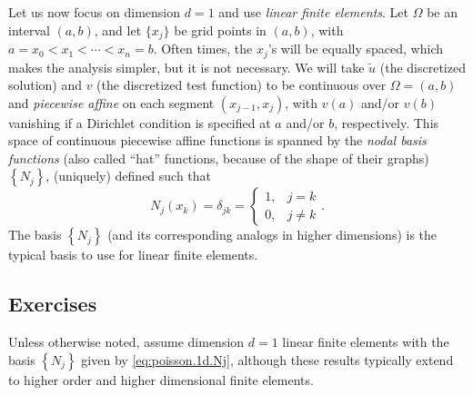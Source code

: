 Let us now focus on dimension $d = 1$ and use \emph{linear finite elements}. Let $\Omega$ be an interval $(a,b)$, and let $\{x_j\}$ be grid points in $(a,b)$, with $a = x_0 < x_1 < \dotsm < x_n = b$. Often times, the $x_j$'s will be equally spaced, which makes the analysis simpler, but it is not necessary. We will take $\tilde{u}$ (the discretized solution) and $v$ (the discretized test function) to be continuous over $\Omega = (a,b)$ and \emph{piecewise affine} on each segment $\left( x_{j-1}, x_j \right)$, with $v(a)$ and/or $v(b)$ vanishing if a Dirichlet condition is specified at $a$ and/or $b$, respectively. This space of continuous piecewise affine functions is spanned by the \emph{nodal basis functions} (also called ``hat'' functions, because of the shape of their graphs) $\left\{ N_j \right\}$, (uniquely) defined such that
\begin{equation}\label{eq:poisson.1d.Nj}
N_j(x_k) = \delta_{jk} = \begin{cases} 1, & j = k \\ 0, & j \neq k \end{cases}.
\end{equation}
The basis $\left\{ N_j \right\}$ (and its corresponding analogs in higher dimensions) is the typical basis to use for linear finite elements.

\subsection{Exercises}

Unless otherwise noted, assume dimension $d = 1$ linear finite elements with the basis $\left\{ N_j \right\}$ given by \eqref{eq:poisson.1d.Nj}, although these results typically extend to higher order and higher dimensional finite elements.


